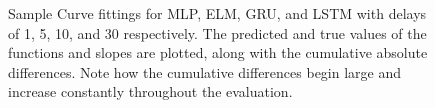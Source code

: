 \documentclass[11pt]{article}
\begin{document}
\begin{figure}
\begin{center}
 \end{center}
 \caption{Sample Curve fittings for MLP, ELM, GRU, and LSTM with
   delays of 1, 5, 10, and 30 respectively. The predicted and true
   values of the functions and slopes are plotted, along with the
   cumulative absolute differences. Note how the cumulative
   differences begin large and increase constantly throughout the evaluation.}
 \label{fig:func_evals}
   \end{figure}
\end{document}
